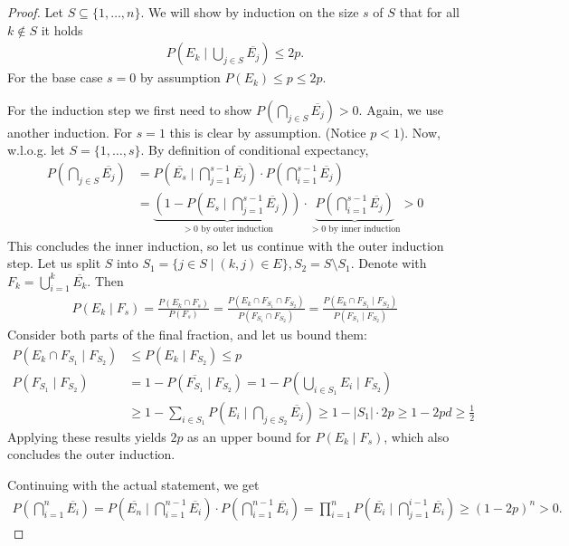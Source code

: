 \begin{proof}
    Let $S \subseteq \{1, \dots, n\}$.
    We will show by induction on the size $s$ of $S$ that for all $k \not \in S$ it holds
    \begin{align}
        P(E_k \mid \bigcup_{j \in S} \overline{E_j}) \leq 2p.
    \end{align}
    For the base case $s=0$ by assumption $P(E_k) \leq p \leq 2p$.

    For the induction step we first need to show $P(\bigcap_{j \in S} \overline{E_j}) > 0$.
    Again, we use another induction.
    For $s=1$ this is clear by assumption. (Notice $p < 1$).
    Now, w.l.o.g. let $S=\{1,\dots, s\}$.
    By definition of conditional expectancy,
    \begin{align*}
        P(\bigcap_{j \in S} \overline{E_j}) & = P(\overline{E_s} \mid \bigcap_{j = 1}^{s-1} \overline{E_j}) \cdot P(\bigcap_{i=1}^{s-1}\overline{E_j})                                                                                                   \\
                                            & = \underbrace{\left(1 - P(E_s \mid \bigcap_{j = 1}^{s-1}\overline{E_j})\right)}_{>0 \text{ by outer induction}}\cdot \underbrace{P(\bigcap_{i=1}^{s-1}\overline{E_j})}_{>0 \text{ by inner induction}} > 0
    \end{align*}
    This concludes the inner induction, so let us continue with the outer induction step.
    Let us split $S$ into $S_1= \{j \in S \mid (k,j) \in E\},S_2 = S \setminus S_1$.
    Denote with $F_k = \bigcup_{i=1}^k \overline{E_k}$.
    Then
    \begin{align*}
        P(E_k \mid F_s) = \frac{P(E_k \cap F_s)}{P(F_s)} = \frac{P(E_k \cap F_{S_1} \cap F_{S_2})}{P(F_{S_1} \cap F_{S_2})} = \frac{P(E_k \cap F_{S_1} \mid F_{S_2})}{P(F_{S_1} \mid F_{S_2})}
    \end{align*}
    Consider both parts of the final fraction, and let us bound them:
    \begin{align*}
        P(E_k \cap F_{S_1} \mid F_{S_2}) & \leq P(E_k \mid F_{S_2}) \leq p                                                                                              \\
        P(F_{S_1} \mid F_{S_2})          & = 1 - P(\overline{F_{S_1}} \mid F_{S_2}) = 1 - P(\bigcup_{i \in S_{1}}E_i \mid F_{S_2})                                      \\
                                         & \geq 1- \sum_{i \in S_1} P(E_i \mid \bigcap_{j \in S_2}\overline{E_j}) \geq 1 - |S_1| \cdot 2p \geq 1 - 2pd \geq \frac{1}{2}
    \end{align*}
    Applying these results yields $2p$ as an upper bound for $P(E_k \mid F_s)$, which also concludes the outer induction.

    Continuing with the actual statement, we get
    \begin{align*}
        P(\bigcap_{i=1}^n \overline{E_i}) = P(\overline{E_n} \mid \bigcap_{i=1}^{n-1} \overline{E_i}) \cdot P(\bigcap_{i=1}^{n-1} \overline{E_i}) =\prod_{i=1}^n P(\overline{E_i} \mid \bigcap_{j=1}^{i-1} \overline{E_i}) \geq (1-2p)^{n} > 0.
    \end{align*}


\end{proof}
